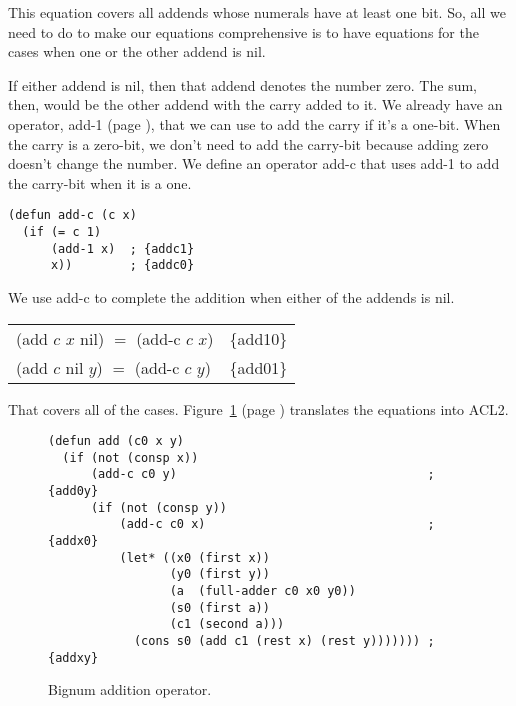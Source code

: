 This equation covers all addends whose numerals have at least one bit.
So, all we need to do to make our equations comprehensive
is to have equations for the cases when one or the other addend is \textsf{nil}.

If either addend is \textsf{nil},
then that addend denotes the number zero.
The sum, then, would be the other addend with the carry added to it.
We already have an operator, \textsf{add-1} (page \pageref{add-1-defun}),
that we can use to add the carry if it's a one-bit.
When the carry is a zero-bit, we don't need to add the carry-bit
because adding zero doesn't change the number.
We define an operator \textsf{add-c}
that uses \textsf{add-1} to add the carry-bit
when it is a one.

\label{add-c-defun} 
\begin{code}
\begin{verbatim}
(defun add-c (c x)
  (if (= c 1)
      (add-1 x)  ; {addc1}
      x))        ; {addc0}
\end{verbatim}
\end{code}

We use \textsf{add-c }to complete the addition when either of the addends is \textsf{nil}.
\begin{center}
\begin{tabular}{ll}
\textsf{(add $c$ $x$ nil)} $=$ \textsf{(add-c $c$ $x$)}   & \{add10\} \\
\textsf{(add $c$ nil $y$)} $=$ \textsf{(add-c $c$ $y$)}   & \{add01\} \\
\end{tabular}
\end{center}

That covers all of the cases.
Figure~\ref{fig:bignum-add-defun} (page \pageref{fig:bignum-add-defun})
translates the equations into ACL2.

\begin{figure}
\begin{code}
\begin{verbatim}
(defun add (c0 x y)
  (if (not (consp x))
      (add-c c0 y)                                   ; {add0y}
      (if (not (consp y))
          (add-c c0 x)                               ; {addx0}
          (let* ((x0 (first x))
                 (y0 (first y))
                 (a  (full-adder c0 x0 y0))
                 (s0 (first a))
                 (c1 (second a)))
            (cons s0 (add c1 (rest x) (rest y))))))) ; {addxy}
\end{verbatim}
\end{code}
\caption{Bignum addition operator.}%
\label{fig:bignum-add-defun}
\end{figure}

